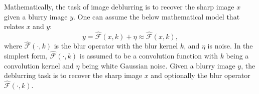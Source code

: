 \documentclass[final]{cvpr}
\begin{document}

Mathematically, the task of image deblurring is to recover the sharp image $x$ given a blurry image $y$. One can assume the below mathematical model that relates $x$ and $y$:
\begin{equation}
    y = \hat{\mathcal{F}}(x, k) + \eta \approx \hat{\mathcal{F}}(x, k),
    \label{eq:generaldeblurring}
\end{equation}
where $\hat{\mathcal{F}}(\cdot, k)$ is the blur operator with the blur kernel $k$, and $\eta$ is noise. In the simplest form, $\hat{\mathcal{F}}(\cdot, k)$ is assumed to be a convolution function with $k$ being a convolution kernel and $\eta$ being white Gaussian noise. Given a blurry image $y$, the deblurring task is to recover the sharp image $x$ and optionally the blur operator $\hat{\mathcal{F}}(\cdot, k)$. 




\end{document}
